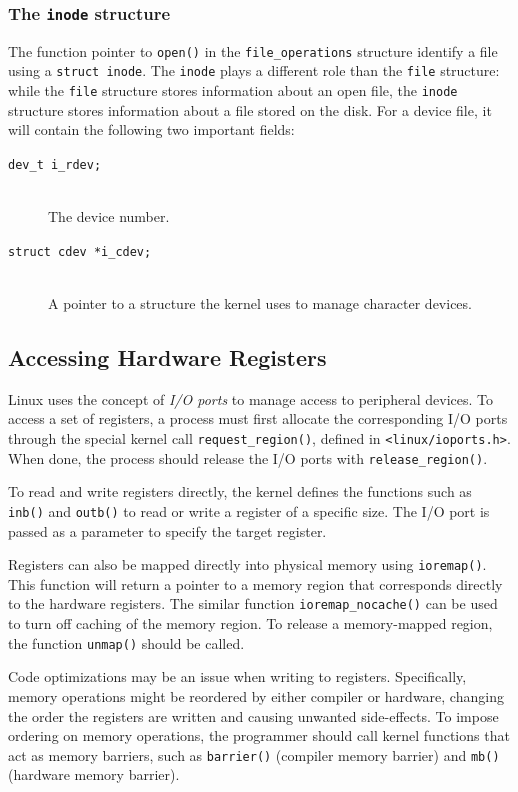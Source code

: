 \subsubsection{The \texttt{inode} structure}
The function pointer to \texttt{open()} in the \texttt{file\_operations} structure identify a file using a \texttt{struct inode}. The \texttt{inode} plays a different role than the \texttt{file} structure: while the \texttt{file} structure stores information about an open file, the \texttt{inode} structure stores information about a file stored on the disk. For a device file, it will contain the following two important fields:
\begin{description}
  \item[\texttt{dev\_t i\_rdev;}] \hfill \\
    The device number.
  \item[\texttt{struct cdev *i\_cdev;}] \hfill \\
    A pointer to a structure the kernel uses to manage character devices.
\end{description}


\subsection{Accessing Hardware Registers}\label{sec:accessing-hardware-registers}
Linux uses the concept of \emph{I/O ports} to manage access to peripheral devices. To access a set of registers, a process must first allocate the corresponding I/O ports through the special kernel call \texttt{request\_region()}, defined in \texttt{<linux/ioports.h>}. When done, the process should release the I/O ports with \texttt{release\_region()}.

To read and write registers directly, the kernel defines the functions such as \texttt{inb()} and \texttt{outb()} to read or write a register of a specific size. The I/O port is passed as a parameter to specify the target register.  

Registers can also be mapped directly into physical memory using \texttt{ioremap()}. This function will return a pointer to a memory region that corresponds directly to the hardware registers. The similar function \texttt{ioremap\_nocache()} can be used to turn off caching of the memory region. To release a memory-mapped region, the function \texttt{unmap()} should be called.

Code optimizations may be an issue when writing to registers. Specifically, memory operations might be reordered by either compiler or hardware, changing the order the registers are written and causing unwanted side-effects. To impose ordering on memory operations, the programmer should call kernel functions that act as memory barriers, such as \texttt{barrier()} (compiler memory barrier) and \texttt{mb()} (hardware memory barrier).



